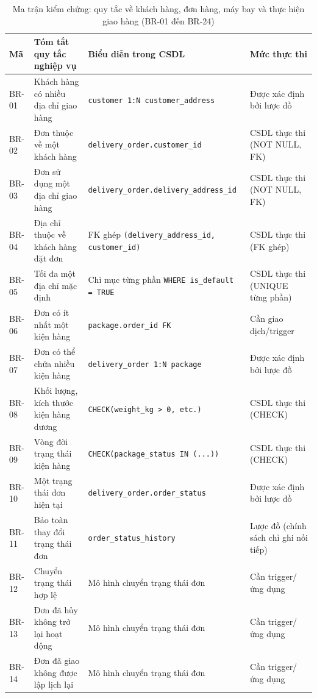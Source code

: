 \begin{table}[htbp]
\caption{Ma trận kiểm chứng: quy tắc về khách hàng, đơn hàng, máy bay và thực hiện giao hàng (BR-01 đến BR-24)}
\label{tab:br_validation_part1}
\centering
\small
\begin{tabular*}{\textwidth}{@{\extracolsep{\fill}} p{1.2cm} p{4.2cm} p{5.5cm} p{3.5cm}}\toprule
\textbf{Mã} & \textbf{Tóm tắt quy tắc nghiệp vụ} & \textbf{Biểu diễn trong CSDL} & \textbf{Mức thực thi} \\
\midrule
BR-01 & Khách hàng có nhiều địa chỉ giao hàng & \texttt{customer 1:N customer\_address} & Được xác định bởi lược đồ \\
BR-02 & Đơn thuộc về một khách hàng & \texttt{delivery\_order.customer\_id} & CSDL thực thi (NOT NULL, FK) \\
BR-03 & Đơn sử dụng một địa chỉ giao hàng & \texttt{delivery\_order.delivery\_address\_id} & CSDL thực thi (NOT NULL, FK) \\
BR-04 & Địa chỉ thuộc về khách hàng đặt đơn & FK ghép \texttt{(delivery\_address\_id, customer\_id)} & CSDL thực thi (FK ghép) \\
BR-05 & Tối đa một địa chỉ mặc định & Chỉ mục từng phần \texttt{WHERE is\_default = TRUE} & CSDL thực thi (UNIQUE từng phần) \\
BR-06 & Đơn có ít nhất một kiện hàng & \texttt{package.order\_id FK} & Cần giao dịch/trigger \\
BR-07 & Đơn có thể chứa nhiều kiện hàng & \texttt{delivery\_order 1:N package} & Được xác định bởi lược đồ \\
BR-08 & Khối lượng, kích thước kiện hàng dương & \texttt{CHECK(weight\_kg > 0, etc.)} & CSDL thực thi (CHECK) \\
BR-09 & Vòng đời trạng thái kiện hàng & \texttt{CHECK(package\_status IN (...))} & CSDL thực thi (CHECK) \\
BR-10 & Một trạng thái đơn hiện tại & \texttt{delivery\_order.order\_status} & Được xác định bởi lược đồ \\
BR-11 & Bảo toàn thay đổi trạng thái đơn & \texttt{order\_status\_history} & Lược đồ (chính sách chỉ ghi nối tiếp) \\
BR-12 & Chuyển trạng thái hợp lệ & Mô hình chuyển trạng thái đơn & Cần trigger/ứng dụng \\
BR-13 & Đơn đã hủy không trở lại hoạt động & Mô hình chuyển trạng thái đơn & Cần trigger/ứng dụng \\
BR-14 & Đơn đã giao không được lập lịch lại & Mô hình chuyển trạng thái đơn & Cần trigger/ứng dụng \\

\end{tabular*}
\end{table}
